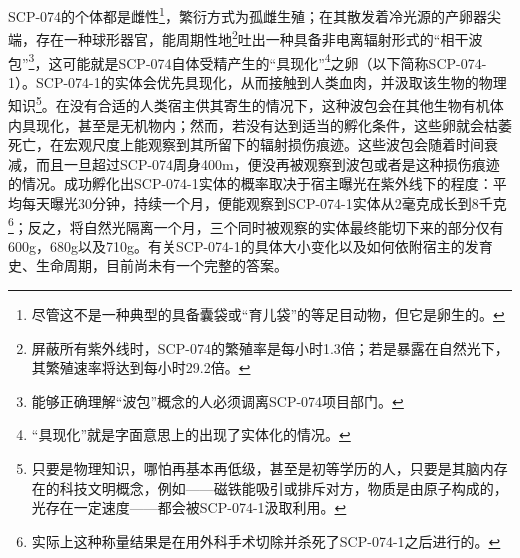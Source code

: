 SCP-074的个体都是雌性\footnote{尽管这不是一种典型的具备囊袋或“育儿袋”的等足目动物，但它是卵生的。}，繁衍方式为孤雌生殖；在其散发着冷光源的产卵器尖端，存在一种球形器官，能周期性地\footnote{屏蔽所有紫外线时，SCP-074的繁殖率是每小时1.3倍；若是暴露在自然光下，其繁殖速率将达到每小时29.2倍。}吐出一种具备非电离辐射形式的“相干波包”\footnote{能够正确理解“波包”概念的人必须调离SCP-074项目部门。}，这可能就是SCP-074自体受精产生的“具现化”\footnote{“具现化”就是字面意思上的出现了实体化的情况。}之卵（以下简称SCP-074-1）。SCP-074-1的实体会优先具现化，从而接触到人类血肉，并汲取该生物的物理知识\footnote{只要是物理知识，哪怕再基本再低级，甚至是初等学历的人，只要是其脑内存在的科技文明概念，例如——磁铁能吸引或排斥对方，物质是由原子构成的，光存在一定速度——都会被SCP-074-1汲取利用。}。在没有合适的人类宿主供其寄生的情况下，这种波包会在其他生物有机体内具现化，甚至是无机物内；然而，若没有达到适当的孵化条件，这些卵就会枯萎死亡，在宏观尺度上能观察到其所留下的辐射损伤痕迹。这些波包会随着时间衰减，而且一旦超过SCP-074周身400m，便没再被观察到波包或者是这种损伤痕迹的情况。成功孵化出SCP-074-1实体的概率取决于宿主曝光在紫外线下的程度：平均每天曝光30分钟，持续一个月，便能观察到SCP-074-1实体从2毫克成长到8千克\footnote{实际上这种称量结果是在用外科手术切除并杀死了SCP-074-1之后进行的。}；反之，将自然光隔离一个月，三个同时被观察的实体最终能切下来的部分仅有600g，680g以及710g。有关SCP-074-1的具体大小变化以及如何依附宿主的发育史、生命周期，目前尚未有一个完整的答案。
